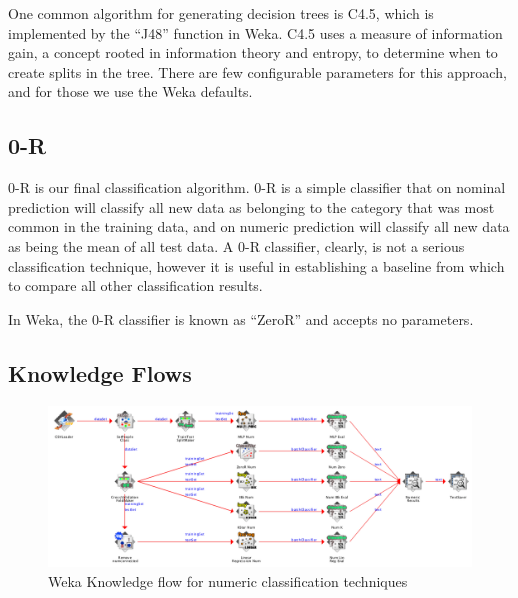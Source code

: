 One common algorithm for generating decision trees is C4.5, which is implemented by the ``J48'' function in Weka. C4.5 uses a measure of information gain, a concept rooted in information theory and entropy, to determine when to create splits in the tree. There are few configurable parameters for this approach, and for those we use the Weka defaults.

\section{0-R}
0-R is our final classification algorithm. 0-R is a simple classifier that on nominal prediction will classify all new data as belonging to the category that was most common in the training data, and on numeric prediction will classify all new data as being the mean of all test data. A 0-R classifier, clearly, is not a serious classification technique, however it is useful in establishing a baseline from which to compare all other classification results.

In Weka, the 0-R classifier is known as ``ZeroR'' and accepts no parameters.

\begin{landscape}
\chapter{Knowledge Flows}
\label{chap:knowledgeflows}

\begin{figure}[H]
\centering
\includegraphics[width=\linewidth]{../diagrams/knowledgeflow-numeric.png}
\caption{Weka Knowledge flow for numeric classification techniques}
\end{figure}
\end{landscape}

